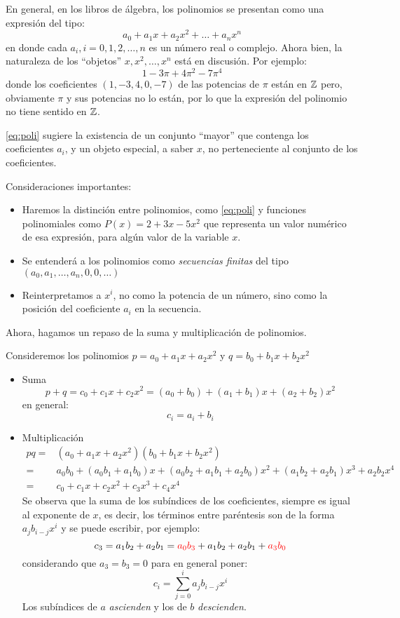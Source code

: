 En general, en los libros de álgebra, los polinomios se presentan como una expresión del tipo:
\begin{equation} \label{eq:poli}
	a_0 + a_1 x + a_2 x^2 + \dots + a_nx^n
\end{equation}
en donde cada $a_i, i = 0, 1, 2, \dots, n$ es un número real o complejo. Ahora bien, la naturaleza de los ``objetos'' $x, x^2, \dots, x^n$ está en discusión. Por ejemplo:
\[ 1 - 3 \pi + 4\pi^2 - 7\pi^4 \]
donde los coeficientes $(1, -3, 4, 0, -7)$ de las potencias de $\pi$ están en $\mathbb{Z}$ pero, obviamente $\pi$ y sus potencias no lo están, por lo que la expresión del polinomio no tiene sentido en $\mathbb{Z}$.

\eqref{eq:poli} sugiere la existencia de un conjunto ``mayor'' que contenga los coeficientes $a_i$, y un objeto especial, a saber $x$, no perteneciente al conjunto de los coeficientes.

Consideraciones importantes:
\begin{itemize}
	\item Haremos la distinción entre polinomios, como \eqref{eq:poli} y funciones polinomiales como $P(x) = 2 + 3x -5x^2$ que representa un valor numérico de esa expresión, para algún valor de la variable $x$.
	\item Se entenderá a los polinomios como \textit{secuencias finitas} del tipo $(a_0, a_1, \dots, a_n, 0, 0, \dots)$
	\item Reinterpretamos a $x^i$, no como la potencia de un número, sino como la posición del coeficiente $a_i$ en la secuencia.
\end{itemize}

Ahora, hagamos un repaso de la suma y multiplicación de polinomios.

\begin{fmd-example}
	Consideremos los polinomios $p = a_0 + a_1x + a_2x^2$ y $q = b_0 + b_1x + b_2x^2$
	
	\begin{itemize}
		\item Suma
		\[ p + q = c_0 + c_1x + c_2x^2 = (a_0 + b_0) + (a_1 + b_1)x + (a_2 + b_2)x^2\]
		en general: \[ c_i = a_i + b_i \]
		\item Multiplicación
		\[ \begin{split}
			pq =& (a_0 + a_1x + a_2x^2)(b_0 + b_1x + b_2x^2)\\
			=& a_0b_0 + (a_0b_1 + a_1b_0)x + (a_0b_2 + a_1b_1 + a_2b_0)x^2 + (a_1b_2 + a_2b_1)x^3 + a_2b_2x^4\\
			=& c_0 + c_1x + c_2x^2 + c_3x^3 + c_4x^4
			\end{split} \]
			Se observa que la suma de los subíndices de los coeficientes, siempre es igual al exponente de $x$, es decir, los términos entre paréntesis son de la forma $a_jb_{i-j}x^{i}$ y se puede escribir, por ejemplo:
			\[ c_3 = a_1b_2 + a_2b_1 = {\color{red} a_0b_3} + a_1b_2 + a_2b_1 + {\color{red} a_3b_0} \]
			considerando que $a_3 = b_3 = 0$ para en general poner:
			\[ c_i = \sum_{j=0}^{i} a_jb_{i-j}x^{i}\]
			Los subíndices de $a$ \textit{ascienden} y los de $b$ \textit{descienden}.
	\end{itemize}
\end{fmd-example}

